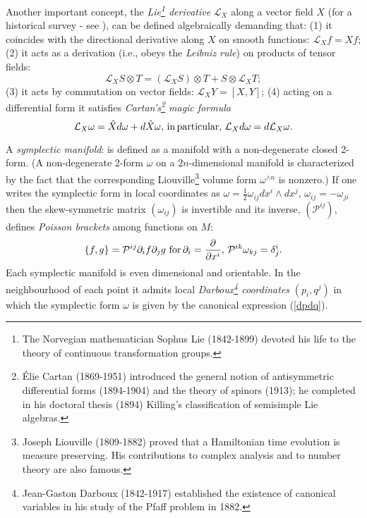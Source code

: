 Another important concept, the {\it Lie\footnote{The Norvegian mathematician Sophus 
Lie (1842-1899) devoted his life to the theory of continuous transformation groups.}
 derivative} ${\mathcal L}_X$ along a
vector field $X$ (for a historical survey - see \cite{Tr}), can be defined
algebraically demanding that: (1) it coincides with the directional derivative
along $X$ on smooth functions: ${\mathcal L}_Xf = Xf$;
(2) it acts as a derivation (i.e., obeys the {\it Leibniz rule}) on products of
 tensor fields:
\begin{equation}
{\mathcal L}_X S\otimes T = ({\mathcal L}_X S)\otimes T +
S\otimes{\mathcal L}_X T;
\end{equation}
(3) it acts by commutation on vector fields: ${\mathcal L}_X Y = [X, Y]$;
(4) acting on a differential form it satisfies {\it Cartan's\footnote{\'Elie 
Cartan (1869-1951) introduced the general notion of antisymmetric differential 
forms (1894-1904) and the theory of spinors (1913); he completed in his 
doctoral thesis (1894) Killing's classification of semisimple Lie algebras.}  
magic formula}
\begin{equation}
{\mathcal L}_X\omega = \hat{X}d\omega + d\hat{X}\omega, \, {\rm in \,
particular}, \, {\mathcal L}_X d\omega = d{\mathcal L}_X \omega.
\end{equation}

A {\it symplectic manifold}: is defined as a manifold with a non-degenerate
closed 2-form. (A non-degenerate 2-form $\omega$ on a $2n$-dimensional manifold is characterized by the fact that 
the corresponding Liouville\footnote{Joseph Liouville (1809-1882) proved that a Hamiltonian time evolution
is measure preserving. His contributions to complex analysis and to number theory are also famous.} volume form 
$\omega^{\wedge n}$ is nonzero.) If one writes the symplectic form in local coordinates as 
$\omega = \frac{1}{2}\omega_{ij}dx^i\wedge dx^j, \, \omega_{ij} = -\omega_{ji}$ then the skew-symmetric 
matrix $(\omega_{ij})$ is invertible and its inverse, $({\mathcal P}^{ij})$, defines {\it Poisson brackets} among functions on $M$:
\begin{equation}
\label{Omega}
\{f, g\} = {\mathcal P}^{ij}\partial_i f \partial_j g \, \, {\rm for} \, \partial_i = \frac{\partial}{\partial x^i}, \, 
 {\mathcal P}^{ik}\omega_{kj} = \delta^i_j.
\end{equation}
Each symplectic manifold is even dimensional and orientable. In the neighbourhood of each point it admits local 
{\it Darboux\footnote{Jean-Gaston Darboux (1842-1917) established the existence of canonical variables in his study of the
 Pfaff problem in 1882.} coordinates} $(p_i, q^j)$ in which the symplectic form $\omega$ is given by the canonical 
expression (\ref{dpdq}). 

